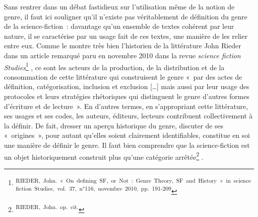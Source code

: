 \documentclass[letterpaper,portrait,12pt]{article}
\begin{document}
	Sans rentrer dans un d\'{e}bat fastidieux sur l'utilisation m\^{e}me de la notion de genre, il faut ici souligner qu'il n'existe pas v\'{e}ritablement de d\'{e}finition du genre de la science-fiction : davantage qu'un ensemble de textes coh\'{e}rent par leur nature, il se caract\'{e}rise par un usage fait de ces textes, une mani\`{e}re de les relier entre eux. Comme le montre tr\`{e}s bien l'historien de la litt\'{e}rature John Rieder dans un article remarqu\'{e} paru en novembre 2010 dans la revue \emph{science fiction Studies}\footnote{\textsuperscript{\newpage
}\textsuperscript{	RIEDER,\ John.\ « On\ defining\ SF,\ or\ Not :\ Genre\ Theory,\ SF\ and\ History »\ in\ science\ fiction\ Studies,\ vol.\ 37,\ n°116,\ novembre\ 2010,\ pp.\ 191-209}} , ce sont les acteurs de la production, de la distribution et de la consommation de cette litt\'{e}rature qui construisent le genre « par des actes de d\'{e}finition, cat\'{e}gorisation, inclusion et exclusion [\ldots{}] mais aussi par leur usage des protocoles et leurs strat\'{e}gies rh\'{e}toriques qui distinguent le genre d'autres formes d'\'{e}criture et de lecture ». En d'autres termes, en s'appropriant cette litt\'{e}rature, ses usages et ses codes, les auteurs, \'{e}diteurs, lecteurs contribuent collectivement \`{a} la d\'{e}finir. De fait, dresser un aper\c{c}u historique du genre, discuter de ses « origines », pour autant qu'elles soient clairement identifiables, constitue en soi une mani\`{e}re de d\'{e}finir le genre. Il faut bien comprendre que la science-fiction est un objet historiquement construit plus qu'une cat\'{e}gorie arr\^{e}t\'{e}e\footnote{\textsuperscript{\newpage
}\textsuperscript{	RIEDER,\ John.\ op.\ cit.}} . 
\end{document}
